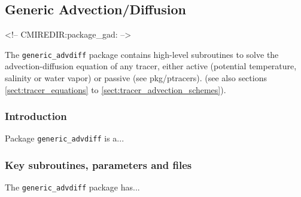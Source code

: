 

\subsection{Generic Advection/Diffusion}
\label{sec:pkg:gad}
\begin{rawhtml}
<!-- CMIREDIR:package_gad: -->
\end{rawhtml}

The {\tt generic\_advdiff} package contains high-level
subroutines to solve the advection-diffusion equation
of any tracer, either active (potential temperature,
salinity or water vapor) or passive (see pkg/ptracers).
(see also sections \ref{sect:tracer_equations} to
\ref{sect:tracer_advection_schemes}).


\subsubsection{Introduction}
Package {\tt generic\_advdiff} is a...


\subsubsection{Key subroutines, parameters and files}
\label{sec:pkg:rw:implementation_synopsis}
The {\tt generic\_advdiff} package has... 



